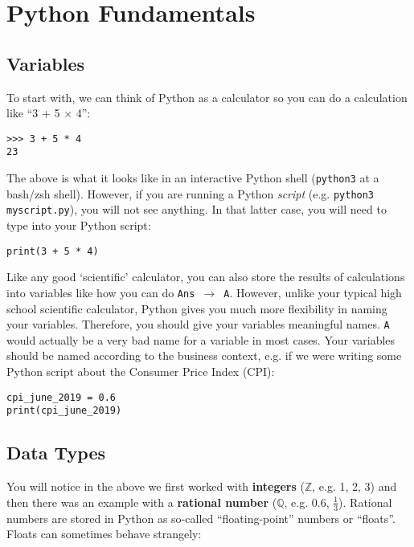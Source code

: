 \section{Python Fundamentals}
\begin{multicols*}{2}
\subsection{Variables}
\par
To start with, we can think of Python as a calculator so you can do a calculation like ``3 + 5 × 4'':

\vspace{-4mm}
\begin{verbatim}
>>> 3 + 5 * 4
23
\end{verbatim}

\par
The above is what it looks like in an interactive Python shell (\texttt{python3} at a bash/zsh shell). However, if you are running a Python \textit{script} (e.g. \texttt{python3 myscript.py}), you will not see anything. In that latter case, you will need to type into your Python script:

\vspace{-4mm}
\begin{verbatim}
print(3 + 5 * 4)
\end{verbatim}

\par
Like any good `scientific' calculator, you can also store the results of calculations into variables like how you can do \texttt{Ans $\rightarrow$ A}. However, unlike your typical high school scientific calculator, Python gives you much more flexibility in naming your variables. Therefore, you should give your variables meaningful names. \texttt{A} would actually be a very bad name for a variable in most cases. Your variables should be named according to the business context, e.g. if we were writing some Python script about the Consumer Price Index (CPI):

\vspace{-4mm}
\begin{verbatim}
cpi_june_2019 = 0.6
print(cpi_june_2019)
\end{verbatim}

\subsection{Data Types}
You will notice in the above we first worked with \textbf{integers} ($\mathbb{Z}$, e.g. 1, 2, 3) and then there was an example with a \textbf{rational number} ($\mathbb{Q}$, e.g. 0.6, $\frac{1}{3}$). Rational numbers are stored in Python as so-called ``floating-point'' numbers or ``floats''. Floats can sometimes behave strangely:


\end{multicols*}
